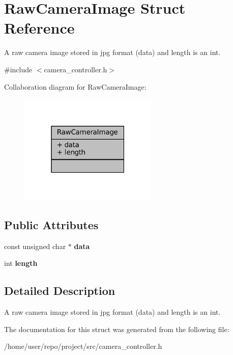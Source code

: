 \hypertarget{structRawCameraImage}{}\section{Raw\+Camera\+Image Struct Reference}
\label{structRawCameraImage}


A raw camera image stored in jpg format (data) and length is an int.  




{\ttfamily \#include $<$camera\+\_\+controller.\+h$>$}



Collaboration diagram for Raw\+Camera\+Image\+:\nopagebreak
\begin{figure}[H]
\begin{center}
\leavevmode
\includegraphics[width=187pt]{structRawCameraImage__coll__graph}
\end{center}
\end{figure}
\subsection*{Public Attributes}
\begin{DoxyCompactItemize}
\item 
\mbox{\label{structRawCameraImage_a7ba5f41faad645c65d7b77be40fd95d0}} 
const unsigned char $\ast$ {\bfseries data}
\item 
\mbox{\label{structRawCameraImage_a628b5c2cf0823c084377e8f5ea502906}} 
int {\bfseries length}
\end{DoxyCompactItemize}


\subsection{Detailed Description}
A raw camera image stored in jpg format (data) and length is an int. 

The documentation for this struct was generated from the following file\+:\begin{DoxyCompactItemize}
\item 
/home/user/repo/project/src/camera\+\_\+controller.\+h\end{DoxyCompactItemize}
